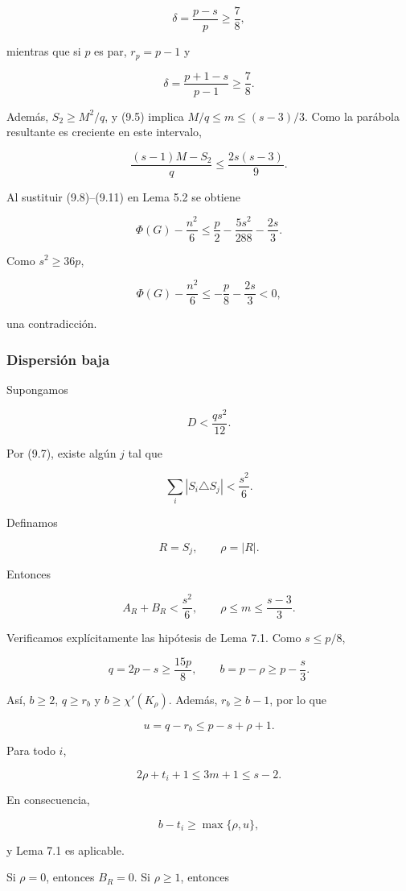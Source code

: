 \documentclass[spanish,11pt,a4paper]{article}
\begin{document}
\[
\delta=\frac{p-s}{p}\ge\frac78,
\]

mientras que si \(p\) es par, \(r_p=p-1\) y

\[
\delta=\frac{p+1-s}{p-1}\ge\frac78.
\]

Además, \(S_2\ge M^2/q\), y (9.5) implica \(M/q\le m\le(s-3)/3\). Como
la parábola resultante es creciente en este intervalo,

\[
\frac{(s-1)M-S_2}{q}
\le
\frac{2s(s-3)}9.
\tag{9.11}
\]

Al sustituir (9.8)--(9.11) en Lema 5.2 se obtiene

\[
\Phi(G)-\frac{n^2}{6}
\le
\frac p2-\frac{5s^2}{288}-\frac{2s}{3}.
\tag{9.12}
\]

Como \(s^2\ge36p\),

\[
\Phi(G)-\frac{n^2}{6}
\le
-\frac p8-\frac{2s}{3}<0,
\]

una contradicción.

\subsubsection{Dispersión baja}\label{dispersiuxf3n-baja}

Supongamos

\[
D<\frac{qs^2}{12}.
\tag{9.13}
\]

Por (9.7), existe algún \(j\) tal que

\[
\sum_i|S_i\triangle S_j|
<
\frac{s^2}{6}.
\tag{9.14}
\]

Definamos

\[
R=S_j,
\qquad
\rho=|R|.
\]

Entonces

\[
A_R+B_R<\frac{s^2}{6},
\qquad
\rho\le m\le\frac{s-3}{3}.
\tag{9.15}
\]

Verificamos explícitamente las hipótesis de Lema 7.1. Como \(s\le p/8\),

\[
q=2p-s\ge\frac{15p}{8},
\qquad
b=p-\rho\ge p-\frac s3.
\]

Así, \(b\ge2\), \(q\ge r_b\) y \(b\ge\chi'(K_\rho)\). Además,
\(r_b\ge b-1\), por lo que

\[
u=q-r_b\le p-s+\rho+1.
\]

Para todo \(i\),

\[
2\rho+t_i+1
\le
3m+1
\le
s-2.
\]

En consecuencia,

\[
b-t_i\ge\max\{\rho,u\},
\]

y Lema 7.1 es aplicable.

Si \(\rho=0\), entonces \(B_R=0\). Si \(\rho\ge1\), entonces
\end{document}
